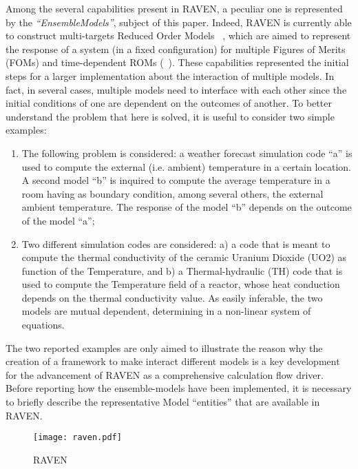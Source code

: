 Among the several capabilities present in RAVEN, a peculiar one is represented by the \textit{``EnsembleModels''}, subject of this paper.
Indeed, RAVEN is currently able to construct multi-targets Reduced Order Models ~\cite{MultiTarget}, which are aimed to represent the response of a system (in a 
fixed configuration) for multiple Figures of Merits (FOMs) and time-dependent ROMs (~\cite{TimeDependentROM}). These capabilities represented the initial steps 
for a larger implementation about the interaction of multiple models. In fact, in several cases, multiple models need to interface with each other since the initial 
conditions of one are dependent on the outcomes of another.
To better understand the problem that here is solved, it is useful to consider two simple examples:
\begin{enumerate}
  \item The following problem is considered: a weather forecast simulation code ``a'' is used to compute the external (i.e. ambient) temperature in a certain location. 
  A second model ``b'' is inquired to compute the average temperature in a room having as boundary condition, among several others, the external ambient 
  temperature. The response of the model ``b'' depends on the outcome of the model ``a'';
   \item Two different simulation codes are considered: a) a code that is meant to compute the thermal conductivity of the ceramic Uranium Dioxide (UO2) as 
   function of the Temperature, and b) a Thermal-hydraulic (TH) code that is used to compute the Temperature field of a reactor, whose heat conduction depends on 
   the thermal conductivity value. As easily inferable, the two models are mutual dependent, determining in a non-linear system of equations.
\end{enumerate}
The two reported examples are only aimed to illustrate the reason why the creation of a framework to make interact different models is a key development for the 
advancement of RAVEN as a comprehensive calculation flow driver. Before reporting how the ensemble-models have been implemented, it is necessary to briefly 
describe the representative Model ``entities'' that are available in RAVEN.



\begin{figure}
    \centering
    \texttt{[image: raven.pdf]}
    \caption{RAVEN}
    \label{fig:raven}
\end{figure}
